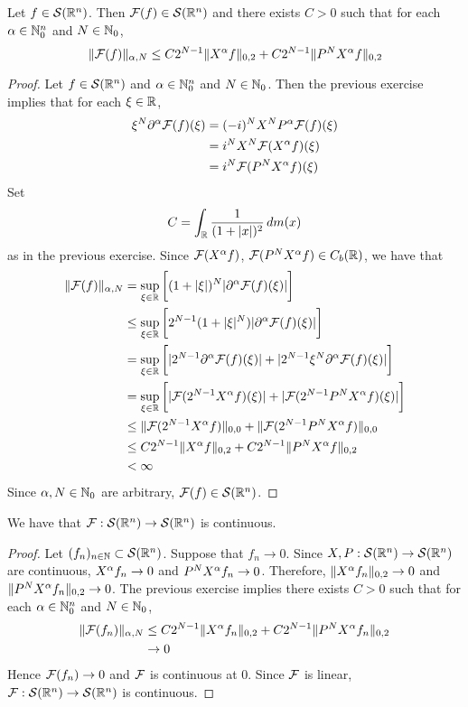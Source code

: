 \documentclass{book}
\begin{document}
	\begin{ex}
		Let $f \in \mathcal{S}(\mathbb{R}^n)$. Then $\mathcal{F}(f) \in \mathcal{S}(\mathbb{R}^n)$ and there exists $C>0$ such that for each $\alpha \in \mathbb{N}_0^n$ and $N \in \mathbb{N}_0$, 
		$$ \|\mathcal{F}(f)\|_{\alpha, N} \leq C2^{N-1}\| X^{\alpha} f \|_{0,2} +  C2^{N-1}\|  P^N X^{\alpha} f\|_{0,2} $$
	\end{ex}

	\begin{proof}
		Let $f \in \mathcal{S}(\mathbb{R}^n)$ and $\alpha \in \mathbb{N}_0^n$ and $N \in \mathbb{N}_0$. Then the previous exercise implies that for each $\xi \in \mathbb{R}$,
		\begin{align*}
			\xi^{N}\partial^{\alpha} \mathcal{F}(f)(\xi)
			& = (-i)^{N} X^{N} P^{\alpha} \mathcal{F}(f)(\xi) \\
			&= i^{N} X^N \mathcal{F}(X^{\alpha} f)(\xi) \\
			&= i^{N} \mathcal{F}(P^{N} X^{\alpha} f)(\xi) 
		\end{align*}
		Set 
		$$C = \int_{\mathbb{R}} \frac{1}{(1+|x|)^2} \, d m(x)$$ 
		as in the previous exercise. Since $\mathcal{F}(X^{\alpha}f)$, $\mathcal{F}(P^NX^{\alpha}f) \in C_b(\mathbb{R})$, we have that
		\begin{align*}
			\|\mathcal{F}(f)\|_{\alpha, N}
			& = \sup_{\xi \in \mathbb{R}} \bigg[ (1 + |\xi|)^N |\partial^{\alpha} \mathcal{F}(f)(\xi)|\bigg] \\
			& \leq \sup_{\xi \in \mathbb{R}} \bigg[ 2^{N-1}(1 + |\xi|^N) |\partial^{\alpha} \mathcal{F}(f)(\xi)| \bigg] \\
			& = \sup_{\xi \in \mathbb{R}} \bigg[ |2^{N-1} \partial^{\alpha} \mathcal{F}(f)(\xi)| + |2^{N-1}\xi^N \partial^{\alpha} \mathcal{F}(f)(\xi)| \bigg] \\
			& = \sup_{\xi \in \mathbb{R}} \bigg[  |\mathcal{F}( 2^{N-1} X^{\alpha} f)(\xi)| + |\mathcal{F}(2^{N-1} P^N X^{\alpha} f)(\xi)| \bigg] \\
			& \leq  \| \mathcal{F}( 2^{N-1} X^{\alpha} f) \|_{0,0} + \| \mathcal{F}(2^{N-1} P^N X^{\alpha} f)\|_{0,0} \\
			& \leq C2^{N-1}\| X^{\alpha} f \|_{0,2} +  C2^{N-1}\|  P^N X^{\alpha} f\|_{0,2} \\
			& < \infty
		\end{align*}
		Since $\alpha, N \in \mathbb{N}_0$ are arbitrary, $\mathcal{F}(f) \in \mathcal{S}(\mathbb{R}^n)$.
	\end{proof}

	\begin{ex}
		We have that $\mathcal{F}: \mathcal{S}(\mathbb{R}^n) \rightarrow \mathcal{S}(\mathbb{R}^n)$ is continuous. 
	\end{ex}

	\begin{proof}
		Let $(f_n)_{n \in \mathbb{N}} \subset \mathcal{S}(\mathbb{R}^n)$. Suppose that $f_n \rightarrow 0$. Since $X,P: \mathcal{S}(\mathbb{R}^n) \rightarrow \mathcal{S}(\mathbb{R}^n)$ are continuous, $X^{\alpha}f_n \rightarrow 0$ and $P^NX^\alpha f_n \rightarrow 0$. Therefore, $\|X^{\alpha}f_n\|_{0, 2} \rightarrow 0$ and $\|P^NX^{\alpha}f_n\|_{0, 2} \rightarrow 0$. The previous exercise implies there exists $C >0$ such that for each $\alpha \in \mathbb{N}_0^n$ and $N \in \mathbb{N}_0$, 
		\begin{align*}
			\|\mathcal{F}(f_n)\|_{\alpha, N} 
			& \leq C2^{N-1}\| X^{\alpha} f_n \|_{0,2} +  C2^{N-1}\|  P^N X^{\alpha} f_n \|_{0,2} \\
			& \rightarrow 0
		\end{align*}
		Hence $\mathcal{F}(f_n) \rightarrow 0$ and $\mathcal{F}$ is continuous at $0$. Since $\mathcal{F}$ is linear, $\mathcal{F}: \mathcal{S}(\mathbb{R}^n) \rightarrow \mathcal{S}(\mathbb{R}^n)$ is continuous. 
	\end{proof}
\end{document}
